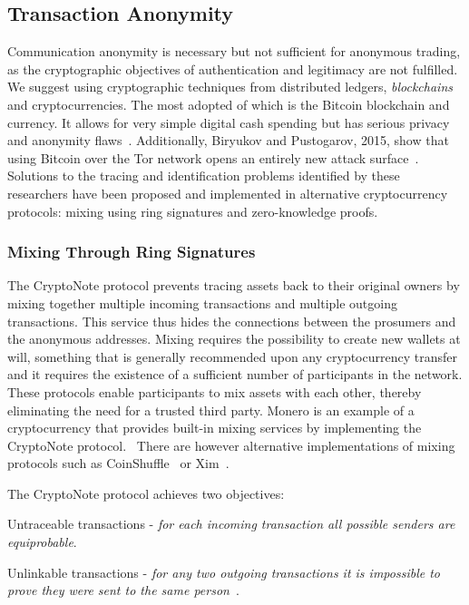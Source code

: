 \subsection{Transaction Anonymity}
\label{trans}
Communication anonymity is necessary but not sufficient for
anonymous trading, as the cryptographic objectives of authentication and legitimacy are not fulfilled. We suggest using cryptographic techniques from distributed ledgers, \textit{blockchains} and cryptocurrencies. The most adopted of which is the Bitcoin blockchain and currency. It allows for very simple digital cash spending but has serious privacy and anonymity flaws~\cite{Barber2012,Reid2013,apostolaki2017}. Additionally, Biryukov and Pustogarov, 2015, show that using Bitcoin over the Tor network opens an entirely new attack surface~\cite{biryukov2015}. Solutions to the tracing and identification problems identified by these researchers have been proposed and implemented in alternative cryptocurrency protocols: mixing using ring signatures and zero-knowledge proofs.~\cite{miers2013zerocoin,cryptonote} 

\subsubsection{Mixing Through Ring Signatures}
The CryptoNote protocol prevents tracing assets back to their original owners by
mixing together multiple incoming transactions and multiple outgoing
transactions. This service thus hides the connections between the
prosumers and the anonymous addresses. Mixing requires the possibility to create new wallets at will, something that is generally recommended upon any cryptocurrency transfer and it requires the existence of a sufficient number of participants in the network. These protocols enable participants to
mix assets with each other, thereby eliminating the need for a trusted
third party. Monero is an example of a cryptocurrency that provides built-in mixing services by implementing the CryptoNote protocol.~\cite{cryptoeprint:2015:1098} There are however alternative implementations of mixing protocols such as CoinShuffle~\cite{ruffing2014coinshuffle} or
Xim~\cite{bissias2014sybil}.

The CryptoNote protocol achieves two objectives:  
\begin{compactenum}
\item Untraceable transactions - \textit{for each incoming transaction all possible senders are equiprobable}. 
\item Unlinkable transactions - \textit{for any two outgoing transactions it is impossible to prove they were
sent to the same person}~\cite{cryptonote}.
\end{compactenum}

